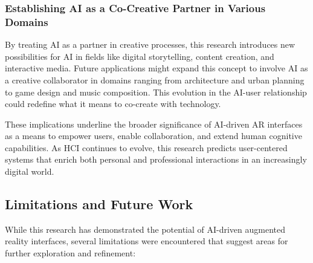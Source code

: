 \subsubsection{Establishing AI as a Co-Creative Partner in Various Domains}
By treating AI as a partner in creative processes, this research introduces new possibilities for AI in fields like digital storytelling, content creation, and interactive media.
Future applications might expand this concept to involve AI as a creative collaborator in domains ranging from architecture and urban planning to game design and music composition.
This evolution in the AI-user relationship could redefine what it means to co-create with technology.%


These implications underline the broader significance of AI-driven AR interfaces as a means to empower users, enable collaboration, and extend human cognitive capabilities.
As HCI continues to evolve, this research predicts user-centered systems that enrich both personal and professional interactions in an increasingly digital world.

\subsection{Limitations and Future Work}

While this research has demonstrated the potential of AI-driven augmented reality interfaces, several limitations were encountered that suggest areas for further exploration and refinement:

    
    
